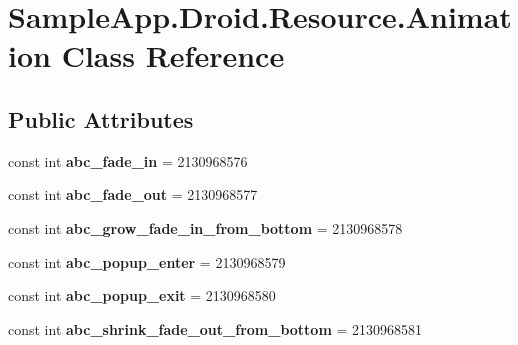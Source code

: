 \hypertarget{class_sample_app_1_1_droid_1_1_resource_1_1_animation}{}\section{Sample\+App.\+Droid.\+Resource.\+Animation Class Reference}
\label{class_sample_app_1_1_droid_1_1_resource_1_1_animation}
\subsection*{Public Attributes}
\begin{DoxyCompactItemize}
\item 
\mbox{\label{class_sample_app_1_1_droid_1_1_resource_1_1_animation_a3c45732d5f0f4d4b6409756dc94e1a16}} 
const int {\bfseries abc\+\_\+fade\+\_\+in} = 2130968576
\item 
\mbox{\label{class_sample_app_1_1_droid_1_1_resource_1_1_animation_ae2d5f9bf3d8c0f95d98278660754334c}} 
const int {\bfseries abc\+\_\+fade\+\_\+out} = 2130968577
\item 
\mbox{\label{class_sample_app_1_1_droid_1_1_resource_1_1_animation_a3b83b56697ba5ab40d688c5f65fcf912}} 
const int {\bfseries abc\+\_\+grow\+\_\+fade\+\_\+in\+\_\+from\+\_\+bottom} = 2130968578
\item 
\mbox{\label{class_sample_app_1_1_droid_1_1_resource_1_1_animation_a2d5883bbb646c41b7bbc4d0d7e4affb0}} 
const int {\bfseries abc\+\_\+popup\+\_\+enter} = 2130968579
\item 
\mbox{\label{class_sample_app_1_1_droid_1_1_resource_1_1_animation_a33ac10e9e742c55dcafa65350fe756f9}} 
const int {\bfseries abc\+\_\+popup\+\_\+exit} = 2130968580
\item 
\mbox{\label{class_sample_app_1_1_droid_1_1_resource_1_1_animation_abc2f798981b814ca9179cb0d04d00702}} 
const int {\bfseries abc\+\_\+shrink\+\_\+fade\+\_\+out\+\_\+from\+\_\+bottom} = 2130968581

\end{DoxyCompactItemize}
